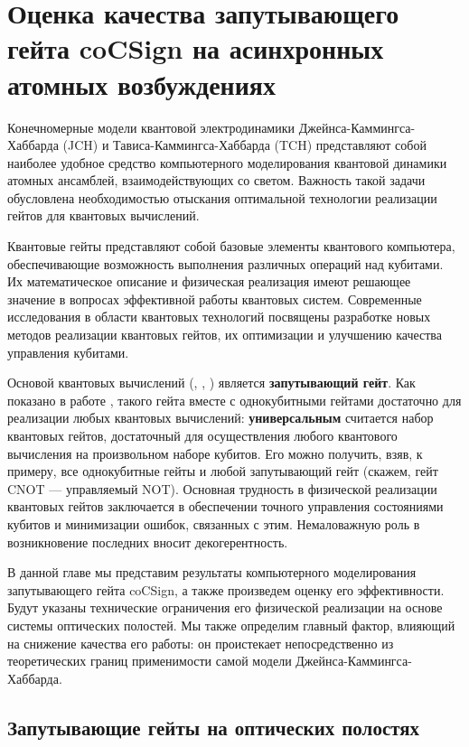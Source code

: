 \chapter{Оценка качества запутывающего гейта coCSign на асинхронных атомных возбуждениях}\label{ch:ch5}

Конечномерные модели квантовой электродинамики Джейнса-Каммингса-Хаббарда (JCH) и Тависа-Каммингса-Хаббарда (TCH) представляют собой наиболее удобное средство компьютерного моделирования квантовой динамики атомных ансамблей, взаимодействующих со светом. Важность такой задачи обусловлена необходимостью отыскания оптимальной технологии реализации гейтов для квантовых вычислений.

Квантовые гейты представляют собой базовые элементы квантового компьютера, обеспечивающие возможность выполнения различных операций над кубитами. Их математическое описание и физическая реализация имеют решающее значение в вопросах эффективной работы квантовых систем. Современные исследования в области квантовых технологий посвящены разработке новых методов реализации квантовых гейтов, их оптимизации и улучшению качества управления кубитами.

Основой квантовых вычислений (\cite{feynman}, \cite{grover}, \cite{shor}) является \textbf{запутывающий гейт}. Как показано в работе \cite{barenco}, такого гейта вместе с однокубитными гейтами достаточно для реализации любых квантовых вычислений: \textbf{универсальным} считается набор квантовых гейтов, достаточный для осуществления любого квантового вычисления на произвольном наборе кубитов. Его можно получить, взяв, к примеру, все однокубитные гейты и любой запутывающий гейт (скажем, гейт CNOT --- управляемый NOT). Основная трудность в физической реализации квантовых гейтов заключается в обеспечении точного управления состояниями кубитов и минимизации ошибок, связанных с этим. Немаловажную роль в возникновение последних вносит декогерентность.

В данной главе мы представим результаты компьютерного моделирования запутывающего гейта coCSign, а также произведем оценку его эффективности. Будут указаны технические ограничения его физической реализации на основе системы оптических полостей. Мы также определим главный фактор, влияющий на снижение качества его работы: он проистекает непосредственно из теоретических границ применимости самой модели Джейнса-Каммингса-Хаббарда.

\clearpage
\section{Запутывающие гейты на оптических полостях}\label{sec:ch5/sect1}

